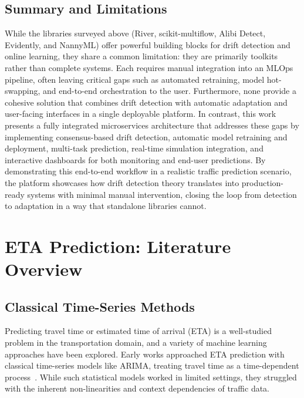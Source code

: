 \subsection{Summary and Limitations}
While the libraries surveyed above (River, scikit-multiflow, Alibi Detect, Evidently, and NannyML) offer powerful building blocks for drift detection and online learning, they share a common limitation: they are primarily toolkits rather than complete systems.
Each requires manual integration into an MLOps pipeline, often leaving critical gaps such as automated retraining, model hot-swapping, and end-to-end orchestration to the user.
Furthermore, none provide a cohesive solution that combines drift detection with automatic adaptation and user-facing interfaces in a single deployable platform.
In contrast, this work presents a fully integrated microservices architecture that addresses these gaps by implementing consensus-based drift detection, automatic model retraining and deployment, multi-task prediction, real-time simulation integration, and interactive dashboards for both monitoring and end-user predictions.
By demonstrating this end-to-end workflow in a realistic traffic prediction scenario, the platform showcases how drift detection theory translates into production-ready systems with minimal manual intervention, closing the loop from detection to adaptation in a way that standalone libraries cannot.

\section{ETA Prediction: Literature Overview}

\subsection{Classical Time-Series Methods}
Predicting travel time or estimated time of arrival (ETA) is a well-studied problem in the transportation domain, and a variety of machine learning approaches have been explored.
Early works approached ETA prediction with classical time-series models like ARIMA, treating travel time as a time-dependent process~\cite{hyndman2018forecasting}.
While such statistical models worked in limited settings, they struggled with the inherent non-linearities and context dependencies of traffic data.

